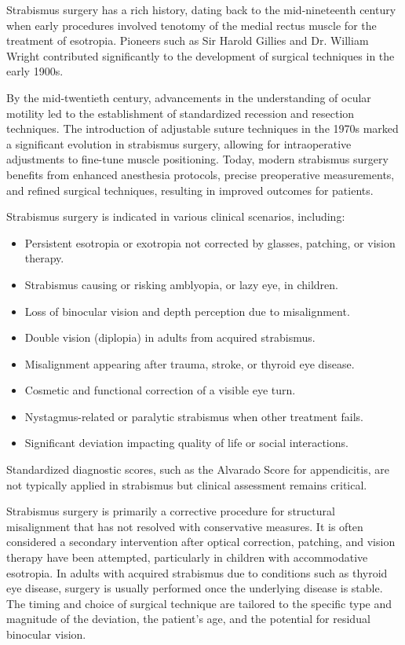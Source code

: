 Strabismus surgery has a rich history, dating back to the mid-nineteenth century when early procedures involved tenotomy of the medial rectus muscle for the treatment of esotropia. Pioneers such as Sir Harold Gillies and Dr. William Wright contributed significantly to the development of surgical techniques in the early 1900s. 

By the mid-twentieth century, advancements in the understanding of ocular motility led to the establishment of standardized recession and resection techniques. The introduction of adjustable suture techniques in the 1970s marked a significant evolution in strabismus surgery, allowing for intraoperative adjustments to fine-tune muscle positioning. Today, modern strabismus surgery benefits from enhanced anesthesia protocols, precise preoperative measurements, and refined surgical techniques, resulting in improved outcomes for patients.

Strabismus surgery is indicated in various clinical scenarios, including:

\begin{itemize}
  \item Persistent esotropia or exotropia not corrected by glasses, patching, or vision therapy.
  \item Strabismus causing or risking amblyopia, or lazy eye, in children.
  \item Loss of binocular vision and depth perception due to misalignment.
  \item Double vision (diplopia) in adults from acquired strabismus.
  \item Misalignment appearing after trauma, stroke, or thyroid eye disease.
  \item Cosmetic and functional correction of a visible eye turn.
  \item Nystagmus-related or paralytic strabismus when other treatment fails.
  \item Significant deviation impacting quality of life or social interactions.
\end{itemize}

Standardized diagnostic scores, such as the Alvarado Score for appendicitis, are not typically applied in strabismus but clinical assessment remains critical.

Strabismus surgery is primarily a corrective procedure for structural misalignment that has not resolved with conservative measures. It is often considered a secondary intervention after optical correction, patching, and vision therapy have been attempted, particularly in children with accommodative esotropia. In adults with acquired strabismus due to conditions such as thyroid eye disease, surgery is usually performed once the underlying disease is stable. The timing and choice of surgical technique are tailored to the specific type and magnitude of the deviation, the patient's age, and the potential for residual binocular vision.

